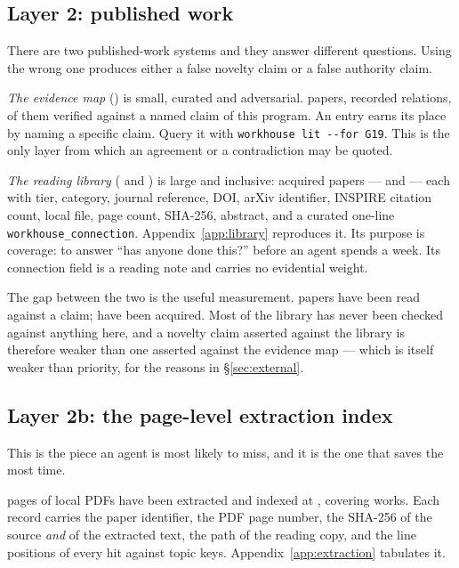 \subsection{Layer 2: published work}

There are two published-work systems and they answer different
questions. Using the wrong one produces either a false novelty claim or
a false authority claim.

\emph{The evidence map} () is small,
curated and adversarial. \LitPapers{} papers, \LitEdges{} recorded
relations, \LitVerified{} of them verified against a named claim of
this program. An entry earns its place by naming a specific claim.
Query it with \texttt{workhouse lit -{}-for G19}. This is the only
layer from which an agreement or a contradiction may be quoted.

\emph{The reading library}
( and
) is large and inclusive: \LibraryPapers{} acquired
papers --- \LibraryVolOne{} and \LibraryVolTwo{} --- each with tier,
category, journal reference, DOI, arXiv identifier, INSPIRE citation
count, local file, page count, SHA-256, abstract, and a curated
one-line \texttt{workhouse\_connection}. Appendix~\ref{app:library}
reproduces it. Its purpose is coverage: to answer ``has anyone done
this?'' before an agent spends a week. Its connection field is a
reading note and carries no evidential weight.

The gap between the two is the useful measurement. \LitObtained{}
papers have been read against a claim; \LibraryPapers{} have been
acquired. Most of the library has never been checked against anything
here, and a novelty claim asserted against the library is therefore
weaker than one asserted against the evidence map --- which is itself
weaker than priority, for the reasons in \S\ref{sec:external}.

\subsection{Layer 2b: the page-level extraction index}

This is the piece an agent is most likely to miss, and it is the one
that saves the most time.

\ExtractedPages{} pages of local PDFs have been extracted and indexed
at , covering
\ExtractedWorks{} works. Each record carries the paper identifier, the
PDF page number, the SHA-256 of the source \emph{and} of the extracted
text, the path of the reading copy, and the line positions of every hit
against \ExtractedTopics{} topic keys. Appendix~\ref{app:extraction}
tabulates it.

